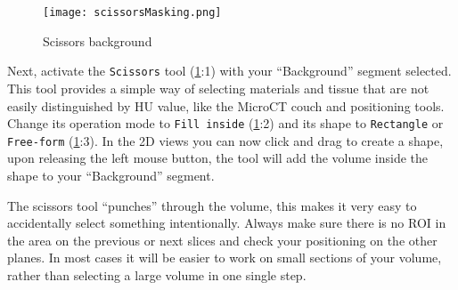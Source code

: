 \pagebreak
\begin{figure}[h!]
	\centerline{
		\texttt{[image: scissorsMasking.png]}}
	\caption{Scissors background}\label{fig:sM}
\end{figure}
\noindent
Next, activate the \texttt{Scissors} tool (\cref{fig:sM}:1) with your ``Background'' segment selected.
This tool provides a simple way of selecting materials and tissue that are not easily distinguished by HU value, like the MicroCT couch and positioning tools.
Change its operation mode to \texttt{Fill inside} (\cref{fig:sM}:2) and its shape to \texttt{Rectangle} or \texttt{Free-form} (\cref{fig:sM}:3).
In the 2D views you can now click and drag to create a shape, upon releasing the left mouse button, the tool will add the volume inside the shape to your ``Background'' segment.
\newline %
\newline %
\begin{minipage}{0.4\textwidth}
	\begin{center}
		
	\end{center}
\end{minipage}%
%
\begin{minipage}{0.5\textwidth}
	The scissors tool ``punches'' through the volume, this makes it very easy to accidentally select something intentionally.
	Always make sure there is no ROI in the area on the previous or next slices and check your positioning on the other planes.
	In most cases it will be easier to work on small sections of your volume, rather than selecting a large volume in one single step.
\end{minipage}

